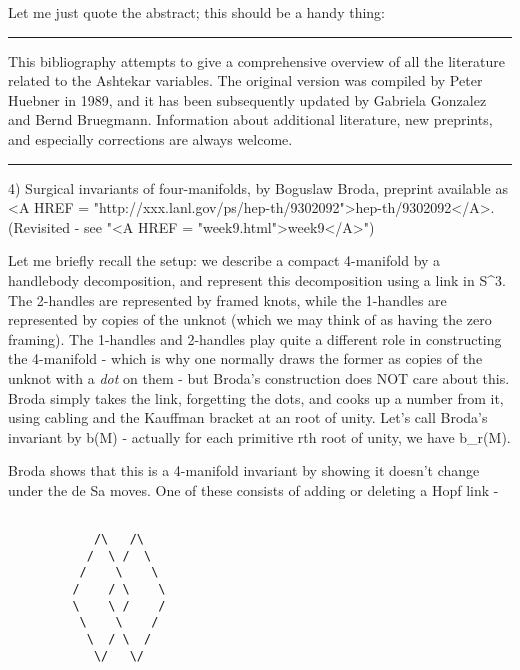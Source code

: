 Let me just quote the abstract; this should be a handy thing:

\par\noindent\rule{\textwidth}{0.4pt}
This bibliography attempts to give a comprehensive overview of all the
literature related to the Ashtekar variables. The original version was
compiled by Peter Huebner in 1989, and it has been subsequently
updated by Gabriela Gonzalez and Bernd Bruegmann.  Information about
additional literature, new preprints, and especially corrections are
always welcome.
\par\noindent\rule{\textwidth}{0.4pt}

4)  Surgical invariants of four-manifolds, by Boguslaw Broda, preprint
available as <A HREF = "http://xxx.lanl.gov/ps/hep-th/9302092">hep-th/9302092</A>.   (Revisited - see "<A HREF = "week9.html">week9</A>")

Let me briefly recall the setup: we describe a compact 4-manifold by a
handlebody decomposition, and represent this decomposition using a link
in S^3.  The 2-handles are represented by framed knots, while the
1-handles are represented by copies of the unknot (which we may think of
as having the zero framing).  The 1-handles and 2-handles play quite a
different role in constructing the 4-manifold  - which is why one
normally draws the former as copies of the unknot with a \emph{dot} on them -
but Broda's construction does NOT care about this.  Broda simply takes
the link, forgetting the dots, and cooks up a number from it, using
cabling and the Kauffman bracket at an root of unity.  Let's call
Broda's invariant by b(M) - actually for each primitive rth root of
unity, we have b_r(M). 

Broda shows that this is a 4-manifold invariant by showing it doesn't
change under the de Sa moves.  One of these consists of adding or
deleting a Hopf link -































\begin{verbatim}

            /\   /\
           /  \ /  \
          /    \    \       
         /    / \    \       
         \    \ /    /
          \    \    /
           \  / \  /
            \/   \/
\end{verbatim}
    

